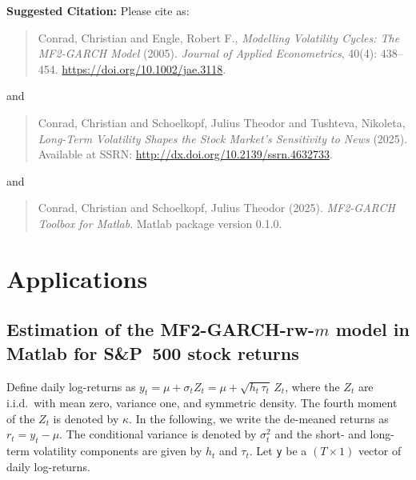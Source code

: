 \documentclass[11pt,noindent]{article}
\newcommand{\1}{\mbox{$\mathrm{1\hspace*{-2.5pt}l}$\,}}   %
\begin{document}
\bigskip
\noindent \textbf{Suggested Citation:} Please cite as:
\begin{quote}
Conrad, Christian and Engle, Robert F., \emph{Modelling Volatility Cycles: The MF2-GARCH Model} (2005). \emph{Journal of Applied Econometrics}, 40(4): 438--454. \href{https://doi.org/10.1002/jae.3118}{https://doi.org/10.1002/jae.3118}.
\end{quote}
and
\begin{quote}
Conrad, Christian and Schoelkopf, Julius Theodor and Tushteva, Nikoleta, \emph{Long-Term Volatility Shapes the Stock Market's Sensitivity to News} (2025). Available at SSRN: \href{http://dx.doi.org/10.2139/ssrn.4632733}{http://dx.doi.org/10.2139/ssrn.4632733}.
\end{quote}
and
\begin{quote}
Conrad, Christian and Schoelkopf, Julius Theodor (2025). \emph{MF2-GARCH Toolbox for Matlab}. Matlab package version 0.1.0.
\end{quote}

 


\section{Applications}
\subsection{Estimation of the MF2-GARCH-rw-$m$ model in Matlab for S\&P~500 stock returns}
Define daily log-returns as \( y_t = \mu + \sigma_t Z_t = \mu + \sqrt{h_t \,\tau_t}\, Z_t \), where the \( Z_t \) are i.i.d.\ with mean zero, variance one, and symmetric density. The fourth moment of the \( Z_t \) is denoted by \( \kappa \). In the following, we write the de-meaned returns as \( r_t = y_t - \mu \). The conditional variance is denoted by \( \sigma_t^2 \) and the short- and long-term volatility components are given by \( h_t \) and \( \tau_t \). Let \texttt{y} be a \((T \times 1)\) vector of daily log-returns.
\end{document}
